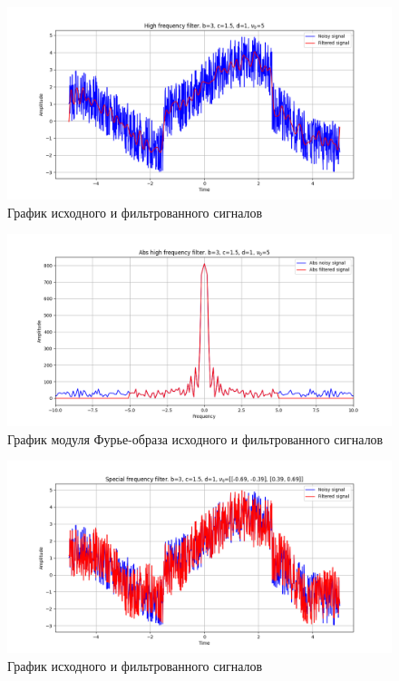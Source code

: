 \documentclass[a4paper, 12pt]{article}
\begin{document}
    \begin{figure}[!htb]
        \centering
        \includegraphics[scale=0.485]{7_u_flt_u_nospec.png}
        \captionsetup{skip=0pt}
        \caption{График исходного и фильтрованного сигналов}
        \label{fig:fig105}
    \end{figure}
    \begin{figure}[!htb]
        \centering
        \includegraphics[scale=0.485]{7_abs_u_U_nospec.png}
        \captionsetup{skip=0pt}
        \caption{График модуля Фурье-образа исходного и фильтрованного сигналов}
        \label{fig:fig106}
    \end{figure}
    \begin{figure}[!htb]
        \centering
        \includegraphics[scale=0.485]{7_1_u_flt_u_nospec.png}
        \captionsetup{skip=0pt}
        \caption{График исходного и фильтрованного сигналов}
        \label{fig:fig107}
    \end{figure}
\end{document}
